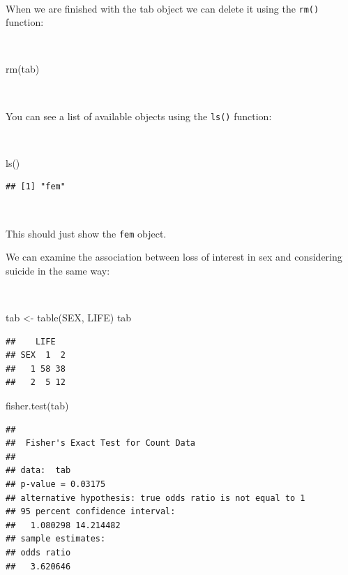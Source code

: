 \documentclass[
  12pt,
]{book}
\newenvironment{Shaded}{\begin{snugshade}}{\end{snugshade}}
\newcommand{\FunctionTok}[1]{\textcolor[rgb]{0.00,0.00,0.00}{#1}}
\newcommand{\NormalTok}[1]{#1}
\newcommand{\OtherTok}[1]{\textcolor[rgb]{0.56,0.35,0.01}{#1}}
\begin{document}
~

When we are finished with the tab object we can delete it using the \texttt{rm()} function:

~

\begin{Shaded}
\begin{Highlighting}[]
\FunctionTok{rm}\NormalTok{(tab)}
\end{Highlighting}
\end{Shaded}

~

You can see a list of available objects using the \texttt{ls()} function:

~

\begin{Shaded}
\begin{Highlighting}[]
\FunctionTok{ls}\NormalTok{()}
\end{Highlighting}
\end{Shaded}

\begin{verbatim}
## [1] "fem"
\end{verbatim}

~

This should just show the \texttt{fem} object.

We can examine the association between loss of interest in sex and considering suicide in the same way:

~

\begin{Shaded}
\begin{Highlighting}[]
\NormalTok{tab }\OtherTok{\textless{}{-}} \FunctionTok{table}\NormalTok{(SEX, LIFE)}
\NormalTok{tab}
\end{Highlighting}
\end{Shaded}

\begin{verbatim}
##    LIFE
## SEX  1  2
##   1 58 38
##   2  5 12
\end{verbatim}

\begin{Shaded}
\begin{Highlighting}[]
\FunctionTok{fisher.test}\NormalTok{(tab)}
\end{Highlighting}
\end{Shaded}

\begin{verbatim}
## 
##  Fisher's Exact Test for Count Data
## 
## data:  tab
## p-value = 0.03175
## alternative hypothesis: true odds ratio is not equal to 1
## 95 percent confidence interval:
##   1.080298 14.214482
## sample estimates:
## odds ratio 
##   3.620646
\end{verbatim}
\end{document}
